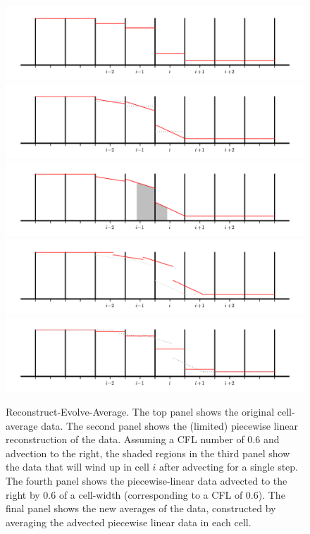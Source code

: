 \begin{figure}
\centering
\includegraphics[width=\linewidth]{rea-start} \\
\includegraphics[width=\linewidth]{rea-reconstruction} \\
\includegraphics[width=\linewidth]{rea-trace} \\
\includegraphics[width=\linewidth]{rea-evolve} \\
\includegraphics[width=\linewidth]{rea-final}
\caption[The Reconstruct-Evolve-Average procedure]{\label{fig:rea}
  Reconstruct-Evolve-Average.  The top panel shows the original
  cell-average data.  The second panel shows the (limited) piecewise
  linear reconstruction of the data.  Assuming a CFL number of 0.6 and
  advection to the right, the shaded regions in the third panel show
  the data that will wind up in cell $i$ after advecting for a single
  step.  The fourth panel shows the piecewise-linear data advected to
  the right by 0.6 of a cell-width (corresponding to a CFL of 0.6).
  The final panel shows the new averages of the data, constructed by
  averaging the advected piecewise linear data in each cell.}
\end{figure}




